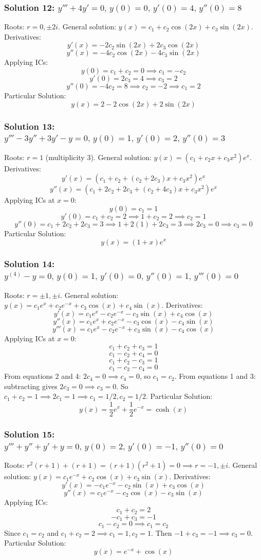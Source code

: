 \documentclass[11pt,letterpaper]{article}
\begin{document}
\subsubsection*{Solution 12: $y''' + 4y' = 0, \, y(0)=0, \, y'(0)=4, \, y''(0)=8$}
Roots: $r = 0, \pm 2i$.
General solution: $y(x) = c_1 + c_2 \cos(2x) + c_3 \sin(2x)$.
Derivatives:
\[ y'(x) = -2c_2 \sin(2x) + 2c_3 \cos(2x) \]
\[ y''(x) = -4c_2 \cos(2x) - 4c_3 \sin(2x) \]
Applying ICs:
\[ y(0) = c_1 + c_2 = 0 \implies c_1 = -c_2 \]
\[ y'(0) = 2c_3 = 4 \implies c_3 = 2 \]
\[ y''(0) = -4c_2 = 8 \implies c_2 = -2 \implies c_1 = 2 \]
Particular Solution:
\[ y(x) = 2 - 2\cos(2x) + 2\sin(2x) \]

\subsubsection*{Solution 13: $y''' - 3y'' + 3y' - y = 0, \, y(0)=1, \, y'(0)=2, \, y''(0)=3$}
Roots: $r = 1$ (multiplicity 3).
General solution: $y(x) = (c_1 + c_2 x + c_3 x^2) e^x$.
Derivatives:
\[ y'(x) = (c_1 + c_2 + (c_2 + 2c_3)x + c_3 x^2) e^x \]
\[ y''(x) = (c_1 + 2c_2 + 2c_3 + (c_2 + 4c_3)x + c_3 x^2) e^x \]
Applying ICs at $x=0$:
\[ y(0) = c_1 = 1 \]
\[ y'(0) = c_1 + c_2 = 2 \implies 1 + c_2 = 2 \implies c_2 = 1 \]
\[ y''(0) = c_1 + 2c_2 + 2c_3 = 3 \implies 1 + 2(1) + 2c_3 = 3 \implies 2c_3 = 0 \implies c_3 = 0 \]
Particular Solution:
\[ y(x) = (1 + x) e^x \]

\subsubsection*{Solution 14: $y^{(4)} - y = 0, \, y(0)=1, \, y'(0)=0, \, y''(0)=1, \, y'''(0)=0$}
Roots: $r = \pm 1, \pm i$.
General solution: $y(x) = c_1 e^x + c_2 e^{-x} + c_3 \cos(x) + c_4 \sin(x)$.
Derivatives:
\[ y'(x) = c_1 e^x - c_2 e^{-x} - c_3 \sin(x) + c_4 \cos(x) \]
\[ y''(x) = c_1 e^x + c_2 e^{-x} - c_3 \cos(x) - c_4 \sin(x) \]
\[ y'''(x) = c_1 e^x - c_2 e^{-x} + c_3 \sin(x) - c_4 \cos(x) \]
Applying ICs at $x=0$:
\[ c_1 + c_2 + c_3 = 1 \]
\[ c_1 - c_2 + c_4 = 0 \]
\[ c_1 + c_2 - c_3 = 1 \]
\[ c_1 - c_2 - c_4 = 0 \]
From equations 2 and 4: $2c_4 = 0 \implies c_4 = 0$, so $c_1 = c_2$.
From equations 1 and 3: subtracting gives $2c_3 = 0 \implies c_3 = 0$.
So $c_1 + c_2 = 1 \implies 2c_1 = 1 \implies c_1 = 1/2, c_2 = 1/2$.
Particular Solution:
\[ y(x) = \frac{1}{2} e^x + \frac{1}{2} e^{-x} = \cosh(x) \]

\subsubsection*{Solution 15: $y''' + y'' + y' + y = 0, \, y(0)=2, \, y'(0)=-1, \, y''(0)=0$}
Roots: $r^2(r+1) + (r+1) = (r+1)(r^2+1) = 0 \implies r = -1, \pm i$.
General solution: $y(x) = c_1 e^{-x} + c_2 \cos(x) + c_3 \sin(x)$.
Derivatives:
\[ y'(x) = -c_1 e^{-x} - c_2 \sin(x) + c_3 \cos(x) \]
\[ y''(x) = c_1 e^{-x} - c_2 \cos(x) - c_3 \sin(x) \]
Applying ICs:
\[ c_1 + c_2 = 2 \]
\[ -c_1 + c_3 = -1 \]
\[ c_1 - c_2 = 0 \implies c_1 = c_2 \]
Since $c_1 = c_2$ and $c_1 + c_2 = 2 \implies c_1 = 1, c_2 = 1$.
Then $-1 + c_3 = -1 \implies c_3 = 0$.
Particular Solution:
\[ y(x) = e^{-x} + \cos(x) \]
\end{document}
